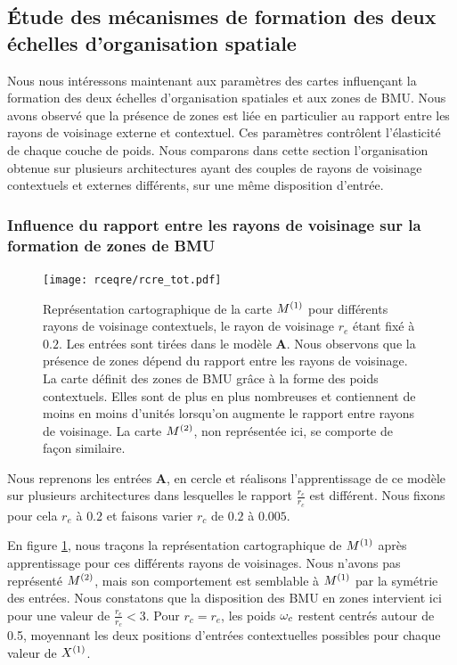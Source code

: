\documentclass[../main]{subfiles}
\begin{document}
\subsection{\'Etude des mécanismes de formation des deux échelles d'organisation spatiale}

Nous nous intéressons maintenant aux paramètres des cartes influençant la formation des deux échelles d'organisation spatiales et aux zones de BMU.
Nous avons observé que la présence de zones est liée en particulier au rapport entre les rayons de voisinage externe et contextuel.
Ces paramètres contrôlent l'élasticité de chaque couche de poids.
Nous comparons dans cette section l'organisation obtenue sur plusieurs architectures ayant des couples de rayons de voisinage contextuels et externes différents, sur une même disposition d'entrée.

\subsubsection{Influence du rapport entre les rayons de voisinage sur la formation de zones de BMU}
\begin{figure}[t]
	\texttt{[image: rceqre/rcre\_tot.pdf]}
	\caption{Représentation cartographique de la carte $M^{({1})}$ pour différents rayons de voisinage contextuels, le rayon de voisinage $r_e$ étant fixé à $0.2$. Les entrées sont tirées dans le modèle \textbf{A}.
	Nous observons que la présence de zones dépend du rapport entre les rayons de voisinage. La carte définit des zones de BMU grâce à la forme des poids contextuels. Elles sont de plus en plus nombreuses et contiennent de moins en moins d'unités lorsqu'on augmente le rapport entre rayons de voisinage.
	La carte $M^{({2})}$, non représentée ici, se comporte de façon similaire.\label{fig:rcre}
	}
\end{figure}

Nous reprenons les entrées \textbf{A}, en cercle et réalisons l'apprentissage de ce modèle sur plusieurs architectures dans lesquelles le rapport $\frac{r_e}{r_c}$ est différent.
Nous fixons  pour cela $r_e$ à $0.2$ et faisons varier $r_c$ de $0.2$ à $0.005$.

En figure \ref{fig:rcre}, nous traçons la représentation cartographique de $M^{({1})}$ après apprentissage pour ces différents rayons de voisinages. 
Nous n'avons pas représenté $M^{({2})}$, mais son comportement est semblable à $M^{({1})}$ par la symétrie des entrées.
Nous constatons que la disposition des BMU en zones intervient ici pour une valeur de $\frac{r_e}{r_c} < 3$. Pour $r_c = r_e$, les poids $\omega_c$ restent centrés autour de 0.5, moyennant les deux positions d'entrées contextuelles possibles pour chaque valeur de $X^{({1})}$.
\end{document}
